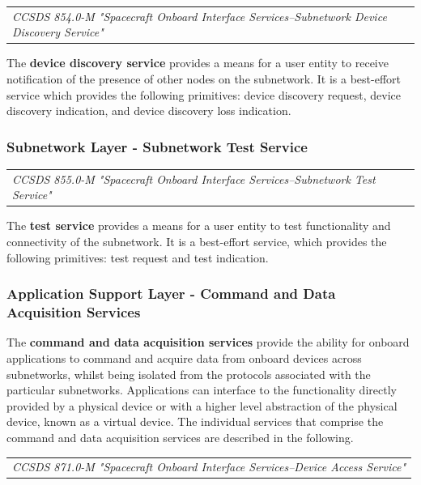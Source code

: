 \begin{tabular}{l}
\textit{CCSDS 854.0-M "Spacecraft Onboard Interface Services--Subnetwork Device Discovery Service" \cite{CCSDS 854.0-M}} 
\end{tabular}

The \textbf{device discovery service} provides a means for a user entity to receive notification of the presence of other nodes on the subnetwork. It is a best-effort service which provides the following primitives: device discovery request, device discovery indication, and device discovery loss indication.

\subsubsection{Subnetwork Layer - Subnetwork Test Service}

\begin{tabular}{l}
\textit{CCSDS 855.0-M "Spacecraft Onboard Interface Services--Subnetwork Test Service" \cite{CCSDS 855.0-M}} 
\end{tabular}

The \textbf{test service} provides a means for a user entity to test functionality and connectivity of the subnetwork. It is a best-effort service, which provides the following primitives: test request and test indication.

\subsubsection{Application Support Layer - Command and Data Acquisition Services}

The \textbf{command and data acquisition services} provide the ability for onboard applications to command and acquire data from onboard devices across subnetworks, whilst being isolated from the protocols associated with the particular subnetworks. Applications can interface to the functionality directly provided by a physical device or with a higher level abstraction of the physical device, known as a virtual device. The individual services that comprise the command and data acquisition services are described in the following.

\begin{tabular}{l}
\textit{CCSDS 871.0-M "Spacecraft Onboard Interface Services--Device Access Service" \cite{CCSDS 871.0-M}} 
\end{tabular}


